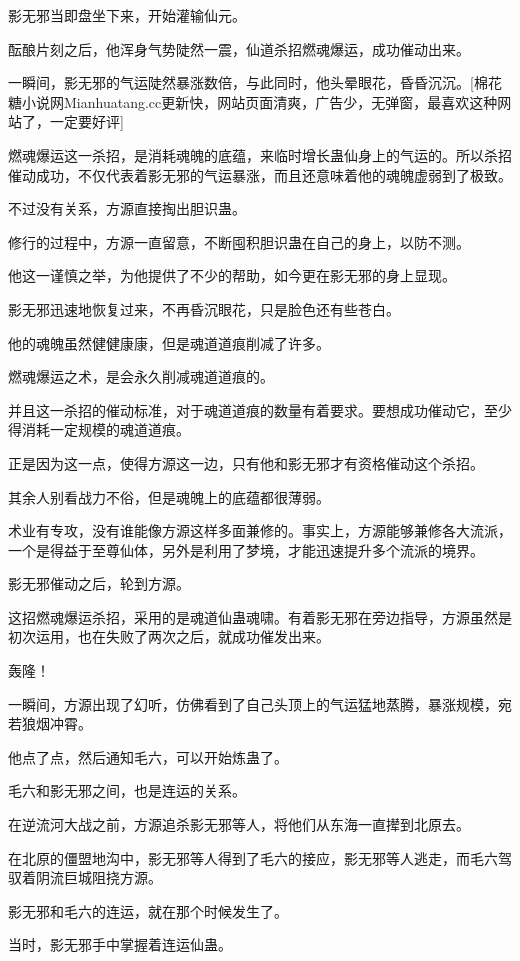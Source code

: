 \begin{this_body}
影无邪当即盘坐下来，开始灌输仙元。

酝酿片刻之后，他浑身气势陡然一震，仙道杀招燃魂爆运，成功催动出来。

一瞬间，影无邪的气运陡然暴涨数倍，与此同时，他头晕眼花，昏昏沉沉。[棉花糖小说网Mianhuatang.cc更新快，网站页面清爽，广告少，无弹窗，最喜欢这种网站了，一定要好评]

燃魂爆运这一杀招，是消耗魂魄的底蕴，来临时增长蛊仙身上的气运的。所以杀招催动成功，不仅代表着影无邪的气运暴涨，而且还意味着他的魂魄虚弱到了极致。

不过没有关系，方源直接掏出胆识蛊。

修行的过程中，方源一直留意，不断囤积胆识蛊在自己的身上，以防不测。

他这一谨慎之举，为他提供了不少的帮助，如今更在影无邪的身上显现。

影无邪迅速地恢复过来，不再昏沉眼花，只是脸色还有些苍白。

他的魂魄虽然健健康康，但是魂道道痕削减了许多。

燃魂爆运之术，是会永久削减魂道道痕的。

并且这一杀招的催动标准，对于魂道道痕的数量有着要求。要想成功催动它，至少得消耗一定规模的魂道道痕。

正是因为这一点，使得方源这一边，只有他和影无邪才有资格催动这个杀招。

其余人别看战力不俗，但是魂魄上的底蕴都很薄弱。

术业有专攻，没有谁能像方源这样多面兼修的。事实上，方源能够兼修各大流派，一个是得益于至尊仙体，另外是利用了梦境，才能迅速提升多个流派的境界。

影无邪催动之后，轮到方源。

这招燃魂爆运杀招，采用的是魂道仙蛊魂啸。有着影无邪在旁边指导，方源虽然是初次运用，也在失败了两次之后，就成功催发出来。

轰隆！

一瞬间，方源出现了幻听，仿佛看到了自己头顶上的气运猛地蒸腾，暴涨规模，宛若狼烟冲霄。

他点了点，然后通知毛六，可以开始炼蛊了。

毛六和影无邪之间，也是连运的关系。

在逆流河大战之前，方源追杀影无邪等人，将他们从东海一直撵到北原去。

在北原的僵盟地沟中，影无邪等人得到了毛六的接应，影无邪等人逃走，而毛六驾驭着阴流巨城阻挠方源。

影无邪和毛六的连运，就在那个时候发生了。

当时，影无邪手中掌握着连运仙蛊。


\end{this_body}
